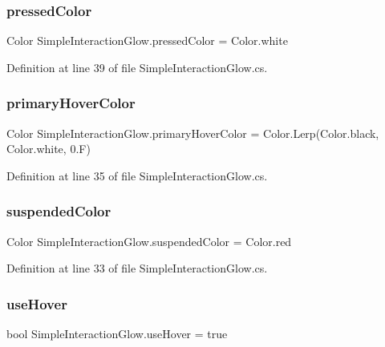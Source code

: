 \subsubsection{\texorpdfstring{pressedColor}{pressedColor}}
{\footnotesize\ttfamily Color Simple\+Interaction\+Glow.\+pressed\+Color = Color.\+white}



Definition at line 39 of file Simple\+Interaction\+Glow.\+cs.

\mbox{\label{class_simple_interaction_glow_a758d68c986bc34965a5a6aebf8f6e1f2}} 
\subsubsection{\texorpdfstring{primaryHoverColor}{primaryHoverColor}}
{\footnotesize\ttfamily Color Simple\+Interaction\+Glow.\+primary\+Hover\+Color = Color.\+Lerp(Color.\+black, Color.\+white, 0.\+F)}



Definition at line 35 of file Simple\+Interaction\+Glow.\+cs.

\mbox{\label{class_simple_interaction_glow_a2c27dd04abd3d432865df53f2abe562c}} 
\subsubsection{\texorpdfstring{suspendedColor}{suspendedColor}}
{\footnotesize\ttfamily Color Simple\+Interaction\+Glow.\+suspended\+Color = Color.\+red}



Definition at line 33 of file Simple\+Interaction\+Glow.\+cs.

\mbox{\label{class_simple_interaction_glow_a346b18ca3d0426fbfc5079e02c515e71}} 
\subsubsection{\texorpdfstring{useHover}{useHover}}
{\footnotesize\ttfamily bool Simple\+Interaction\+Glow.\+use\+Hover = true}



